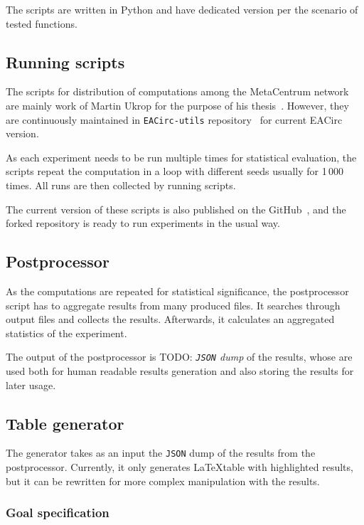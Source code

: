 \documentclass[
  print, %
  Table,   %
  nolof,     %
  nolot,     %
  11pt, %
  oneside  %
]{fithesis3}
\newcommand{\todo}[1]{TODO: \textit{#1}}
\begin{document}
The scripts are written in Python and have dedicated version per the scenario of tested functions.

\subsection{Running scripts}

The scripts for distribution of computations among the MetaCentrum network are mainly work of Martin Ukrop for the purpose of his thesis~\cite{ukropMgrThesis}. However, they are continuously maintained in \texttt{EACirc-utils} repository~\cite{eaUtils} for current EACirc version.

As each experiment needs to be run multiple times for statistical evaluation, the scripts repeat the computation in a loop with different seeds usually for 1\,000 times. All runs are then collected by running scripts.

The current version of these scripts is also published on the GitHub~\cite{eaUtils}, and the forked repository is ready to run experiments in the usual way.

\subsection{Postprocessor}

As the computations are repeated for statistical significance, the postprocessor script has to aggregate results from many produced files. It searches through output files and collects the results. Afterwards, it calculates an aggregated statistics of the experiment.

The output of the postprocessor is \todo{\texttt{JSON} dump} of the results, whose are used both for human readable results generation and also storing the results for later usage.

\subsection{Table generator}

The generator takes as an input the \texttt{JSON} dump of the results from the postprocessor. Currently, it only generates \LaTeX table with highlighted results, but it can be rewritten for more complex manipulation with the results.

\subsubsection{Goal specification}
\end{document}
